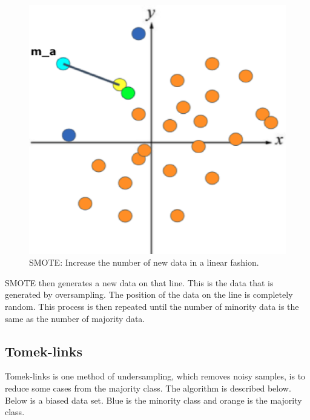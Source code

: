 \begin{center}
    \begin{figure}[ht]
        \caption{SMOTE: Increase the number of new data in a linear fashion.}
        \label{tab:team-rating-features}
        \begin{center}
            \includegraphics[scale=0.6]{image/smote5.eps}
        \end{center}
    \end{figure}
\end{center}

SMOTE then generates a new data on that line. This is the data that is generated by oversampling. The position of the data on the line is completely random. 
This process is then repeated until the number of minority data is the same as the number of majority data.

\clearpage
\subsection{Tomek-links}
Tomek-links is one method of undersampling, which removes noisy samples, is to reduce some cases from the majority class\cite{TomekLinks}.
The algorithm is described below. Below is a biased data set. Blue is the minority class  and orange is the majority class.

